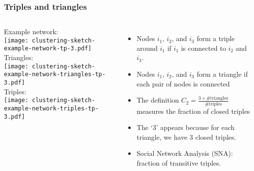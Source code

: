 \begin{frame}
  \frametitle{Triples and triangles}

  \begin{block}{}
  \begin{columns}
    \centering
    Example network:\\
    \texttt{[image: clustering-sketch-example-network-tp-3.pdf]}\\
    Triangles:\\
    \texttt{[image: clustering-sketch-example-network-triangles-tp-3.pdf]}\\
    Triples:\\
    \texttt{[image: clustering-sketch-example-network-triples-tp-3.pdf]}
    \begin{itemize}
    \item<1->
      Nodes $i_1$, $i_2$, and $i_3$ form a \alert{triple}
      around $i_1$ if $i_1$ is connected to $i_2$ and $i_3$.
    \item<2->
      Nodes $i_1$, $i_2$, and $i_3$ form a \alert{triangle}
      if each pair of nodes is connected
    \item<3-> 
      The definition
      $ C_2 = \frac{3 \times \textrm{\#triangles}}{\textrm{\#triples}} $
      measures the fraction of \alert{closed triples}
    \item<4-> 
      The \alert{`3'} appears because for each
      triangle, we have 3 closed triples.
    \item<5-> 
      Social Network Analysis (SNA): fraction of
      \alert{transitive triples}.
    \end{itemize}
  \end{columns}
  \end{block}

\end{frame}

